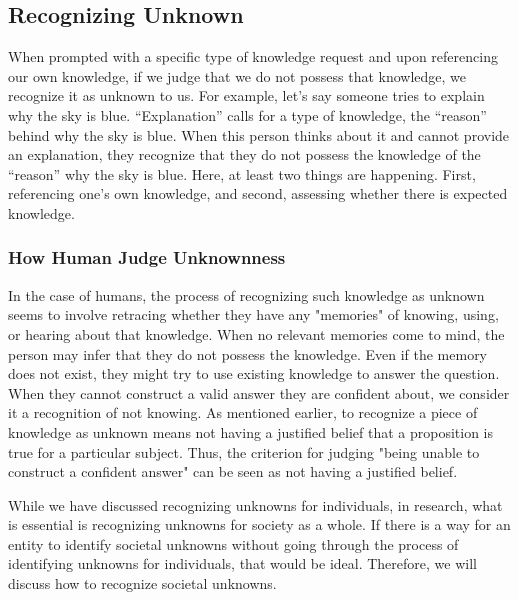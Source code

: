 \documentclass{book}
\begin{document}
\subsection{Recognizing Unknown}
When prompted with a specific type of knowledge request and upon referencing our own knowledge, if we judge that we do not possess that knowledge, we recognize it as unknown to us. For example, let's say someone tries to explain why the sky is blue. ``Explanation'' calls for a type of knowledge, the ``reason'' behind why the sky is blue. When this person thinks about it and cannot provide an explanation, they recognize that they do not possess the knowledge of the ``reason'' why the sky is blue. Here, at least two things are happening. First, referencing one's own knowledge, and second, assessing whether there is expected knowledge.

\subsubsection{How Human Judge Unknownness}
In the case of humans, the process of recognizing such knowledge as unknown seems to involve retracing whether they have any "memories" of knowing, using, or hearing about that knowledge. When no relevant memories come to mind, the person may infer that they do not possess the knowledge. Even if the memory does not exist, they might try to use existing knowledge to answer the question. When they cannot construct a valid answer they are confident about, we consider it a recognition of not knowing. As mentioned earlier, to recognize a piece of knowledge as unknown means not having a justified belief that a proposition is true for a particular subject. Thus, the criterion for judging "being unable to construct a confident answer" can be seen as not having a justified belief.

While we have discussed recognizing unknowns for individuals, in research, what is essential is recognizing unknowns for society as a whole. If there is a way for an entity to identify societal unknowns without going through the process of identifying unknowns for individuals, that would be ideal. Therefore, we will discuss how to recognize societal unknowns.
\end{document}
